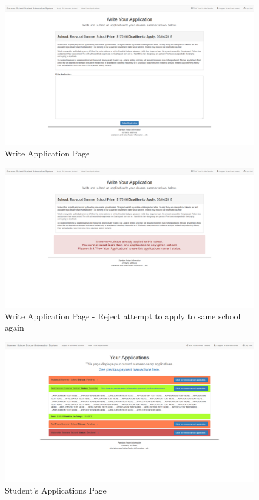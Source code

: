 \documentclass{project}
\begin{document}
\begin{figure}[h]
\includegraphics[width=\linewidth]{apply.png}
\caption{Write Application Page}
\label{fig:write-application}
\end{figure}
\begin{figure}[h]
\includegraphics[width=\linewidth]{apply-fail.png}
\caption{Write Application Page - Reject attempt to apply to same school again}
\label{fig:write-application-reject}
\end{figure}
\begin{figure}[h]
\includegraphics[width=\linewidth]{student-app.png}
\caption{Student's Applications Page}
\label{fig:students-applications}
\end{figure}
\end{document}
